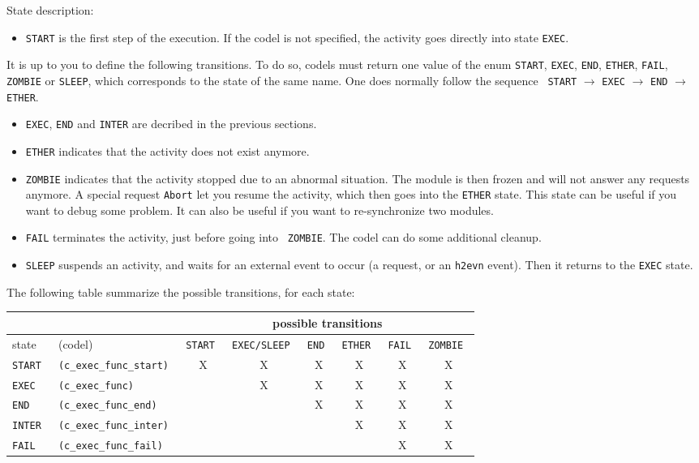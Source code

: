 State description:

\begin{itemize}
\item {\tt START} is the first step of the execution. If the codel is not
specified, the activity goes directly into state {\tt EXEC}.
\end{itemize}

It is up  to you to define the   following transitions. To  do so, codels
must return one value of  the enum {\tt  START},  {\tt EXEC}, {\tt  END},
{\tt ETHER},  {\tt FAIL}, {\tt  ZOMBIE} or {\tt SLEEP}, which corresponds
to the state of the same name. One does normally follow the sequence {\tt
START} $\rightarrow$ {\tt   EXEC} $\rightarrow$  {\tt  END} $\rightarrow$
{\tt ETHER}.

\begin{itemize}
\item {\tt EXEC}, {\tt END} and {\tt INTER} are decribed in the previous
sections.

\item {\tt ETHER} indicates that the activity does not exist anymore.

\item {\tt ZOMBIE} indicates that the activity stopped due to an abnormal
situation. The module  is then  frozen and  will not answer  any requests
anymore. A special request {\tt Abort} let you resume the activity, which
then  goes into the  {\tt ETHER} state. This  state can  be useful if you
want  to debug  some problem.  It   can also be  useful   if you want  to
re-synchronize two modules.

\item {\tt FAIL} terminates the activity, just before going into {\tt
ZOMBIE}. The codel can do some additional cleanup.

\item {\tt SLEEP} suspends an activity, and waits for an external event
to occur (a request,  or an {\tt  h2evn} event). Then  it returns  to the
{\tt EXEC} state.
\end{itemize}

The following table summarize the possible transitions, for each state:

\bigbreak

{\small\begin{tabular}{|ll||c|c|c|c|c|c|}
\cline{3-8}
\multicolumn{2}{c}{} & \multicolumn{6}{|c|}{possible transitions} \\
\hline
state & (codel) & \tt START & \tt EXEC/SLEEP & \tt END & \tt ETHER & \tt FAIL & \tt ZOMBIE \\
\hline
\tt START  & \tt (c\_exec\_func\_start)	& X & X & X & X & X & X \\
\tt EXEC   & \tt (c\_exec\_func) 	&   & X & X & X & X & X \\
\tt END    & \tt (c\_exec\_func\_end) 	&   &   & X & X & X & X \\
\tt INTER  & \tt (c\_exec\_func\_inter) &   &   &   & X & X & X \\
\tt FAIL   & \tt (c\_exec\_func\_fail) 	&   &   &   &   & X & X \\
\hline
\end{tabular}}

